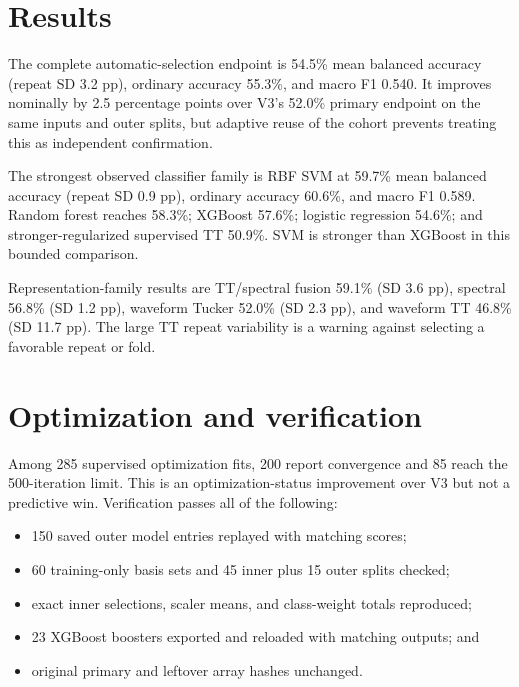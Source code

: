 \section{Results}



The complete automatic-selection endpoint is 54.5\% mean balanced accuracy
(repeat SD 3.2 pp), ordinary accuracy 55.3\%, and macro F1 0.540. It improves
nominally by 2.5 percentage points over V3's 52.0\% primary endpoint on the same
inputs and outer splits, but adaptive reuse of the cohort prevents treating this
as independent confirmation.

The strongest observed classifier family is RBF SVM at 59.7\% mean balanced
accuracy (repeat SD 0.9 pp), ordinary accuracy 60.6\%, and macro F1 0.589.
Random forest reaches 58.3\%; XGBoost 57.6\%; logistic regression 54.6\%; and
stronger-regularized supervised TT 50.9\%. SVM is stronger than XGBoost in this
bounded comparison.

Representation-family results are TT/spectral fusion 59.1\% (SD 3.6 pp),
spectral 56.8\% (SD 1.2 pp), waveform Tucker 52.0\% (SD 2.3 pp), and waveform TT
46.8\% (SD 11.7 pp). The large TT repeat variability is a warning against
selecting a favorable repeat or fold.

\section{Optimization and verification}

Among 285 supervised optimization fits, 200 report convergence and 85 reach the
500-iteration limit. This is an optimization-status improvement over V3 but not
a predictive win. Verification passes all of the following:

\begin{itemize}
  \item 150 saved outer model entries replayed with matching scores;
  \item 60 training-only basis sets and 45 inner plus 15 outer splits checked;
  \item exact inner selections, scaler means, and class-weight totals reproduced;
  \item 23 XGBoost boosters exported and reloaded with matching outputs; and
  \item original primary and leftover array hashes unchanged.
\end{itemize}

